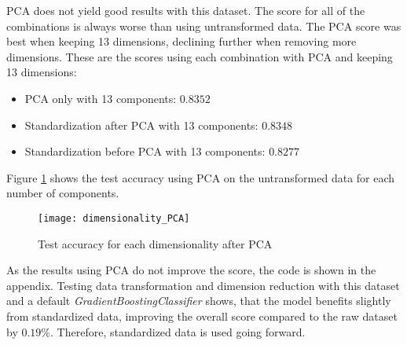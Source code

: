 \ac{PCA} does not yield good results with this dataset. The score for all of the combinations is always worse
than using untransformed data. 
The PCA score was best when keeping 13 dimensions, declining further when removing more dimensions.
These are the scores using each combination with PCA and keeping 13 dimensions:

\begin{itemize}
    \item PCA only with 13 components: $0.8352$
    \item Standardization after PCA with 13 components: $0.8348$
    \item Standardization before PCA with 13 components: $0.8277$
\end{itemize}

Figure \ref{fig:Score for each PCA dimensionality} shows the test accuracy using PCA on the untransformed data
for each number of components.

\begin{figure}[H]
    \caption{Test accuracy for each dimensionality after PCA}
	\label{fig:Score for each PCA dimensionality}
    \texttt{[image: dimensionality\_PCA]}
\end{figure}

As the results using \ac{PCA} do not improve the score, the code is shown in the appendix.
Testing data transformation and dimension reduction with this dataset and a default \emph{GradientBoostingClassifier}
shows, that the model benefits slightly from standardized data, improving the overall score compared to the raw dataset
by $0.19\%$. Therefore, standardized data is used going forward.


